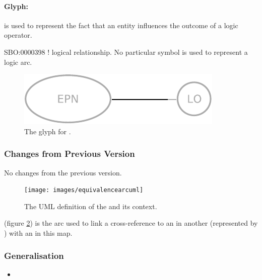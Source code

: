 \paragraph{Glyph:  }\label{sec:techref:logicArc}

 is used to represent the fact that an entity influences
the outcome of a logic operator.

\begin{glyphDescription}
 \glyphSboTerm SBO:0000398 ! logical relationship.
 \glyphEndPoint No particular symbol is used to represent a logic arc.
 \end{glyphDescription}

\begin{figure}[htb]
  \centering
  \includegraphics[scale = 0.4]{images/logicArc}
  \caption{The \PD glyph for .}
  \label{fig:techref:logicArc}
\end{figure}

\subsubsection{Changes from Previous Version}

No changes from the previous version.

\label{defn:EquivalenceArc}

\begin{figure}[htb]
  \centering
  \texttt{[image: images/equivalencearcuml]}
  \caption{The UML definition of the  and its context.}
  \label{fig:techref:equivalencearcuml}
\end{figure}


 (figure \ref{fig:techref:equivalencearcuml}) is the arc used to link a cross-reference
to an  in another \PDm (represented by )
with an  in this map.

\subsubsection{Generalisation}

\begin{itemize}
\item {}
\end{itemize}

